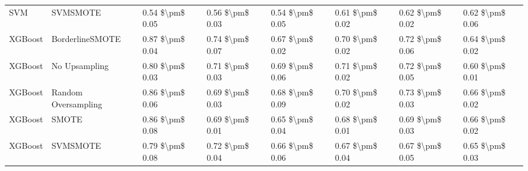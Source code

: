 \begin{tabular}{llllllll}
                            SVM &                      SVMSMOTE & 0.54 \$\textbackslash pm\$ 0.05 &           0.56 \$\textbackslash pm\$ 0.03 &       0.54 \$\textbackslash pm\$ 0.05 &        0.61 \$\textbackslash pm\$ 0.02 &                         0.62 \$\textbackslash pm\$ 0.02 & 0.62 \$\textbackslash pm\$ 0.06 \\
                        XGBoost &               BorderlineSMOTE & 0.87 \$\textbackslash pm\$ 0.04 &           0.74 \$\textbackslash pm\$ 0.07 &       0.67 \$\textbackslash pm\$ 0.02 &        0.70 \$\textbackslash pm\$ 0.02 &                         0.72 \$\textbackslash pm\$ 0.06 & 0.64 \$\textbackslash pm\$ 0.02 \\
                        XGBoost &                 No Upsampling & 0.80 \$\textbackslash pm\$ 0.03 &           0.71 \$\textbackslash pm\$ 0.03 &       0.69 \$\textbackslash pm\$ 0.06 &        0.71 \$\textbackslash pm\$ 0.02 &                         0.72 \$\textbackslash pm\$ 0.05 & 0.60 \$\textbackslash pm\$ 0.01 \\
                        XGBoost &           Random Oversampling & 0.86 \$\textbackslash pm\$ 0.06 &           0.69 \$\textbackslash pm\$ 0.03 &       0.68 \$\textbackslash pm\$ 0.09 &        0.70 \$\textbackslash pm\$ 0.02 &                         0.73 \$\textbackslash pm\$ 0.03 & 0.66 \$\textbackslash pm\$ 0.02 \\
                        XGBoost &                         SMOTE & 0.86 \$\textbackslash pm\$ 0.08 &           0.69 \$\textbackslash pm\$ 0.01 &       0.65 \$\textbackslash pm\$ 0.04 &        0.68 \$\textbackslash pm\$ 0.01 &                         0.69 \$\textbackslash pm\$ 0.03 & 0.66 \$\textbackslash pm\$ 0.02 \\
                        XGBoost &                      SVMSMOTE & 0.79 \$\textbackslash pm\$ 0.08 &           0.72 \$\textbackslash pm\$ 0.04 &       0.66 \$\textbackslash pm\$ 0.06 &        0.67 \$\textbackslash pm\$ 0.04 &                         0.67 \$\textbackslash pm\$ 0.05 & 0.65 \$\textbackslash pm\$ 0.03 \\
\bottomrule
\end{tabular}
